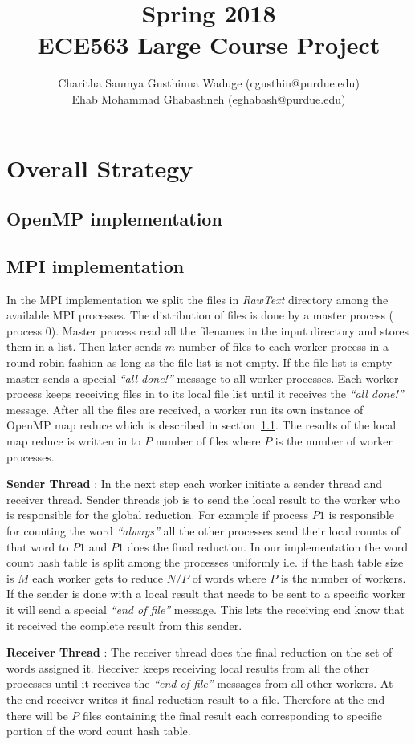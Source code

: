 \documentclass[12pt]{article}
\title{Spring 2018\\  ECE563 Large Course Project}
\author{Charitha Saumya Gusthinna Waduge (cgusthin@purdue.edu) \\ Ehab Mohammad Ghabashneh (eghabash@purdue.edu)}
\begin{document}
\maketitle
\section{Overall Strategy}
\subsection{OpenMP implementation}
\label{omp-impl}
\subsection{MPI implementation}
In the MPI implementation we split the files in {\em RawText } directory among the available MPI processes. The distribution of files is done by a master process ( process $0$).
Master process read all the filenames in the input directory and stores them in a list. Then later sends $m$  number of files to each worker process in a round robin fashion as long as the file
list is not empty. If the file list is empty master sends a special {\em ``all done!''} message to all worker processes. Each worker process keeps receiving files in to its local file list until
it receives the {\em``all done!''} message. After all the files are received, a worker run its own instance of OpenMP map reduce which is described in section~\ref{omp-impl}. The results of the
local map reduce is written in to $P$ number of files where $P$ is the number of worker processes. 

\noindent \textbf{Sender Thread} : In the next step each worker initiate a sender thread and receiver thread. Sender threads job is
to send the local result to the worker who is responsible for the global reduction. For example if process $P1$ is responsible for counting the word {\em ``always''} all the other processes send their
local counts of that word to $P1$ and $P1$ does the final reduction. In our implementation the word count hash table is split among the processes uniformly i.e. if the hash table size is $M$ each worker gets 
to reduce $N/P$ of words where $P$ is the number of workers. If the sender is done with a local result that needs to be sent to a specific worker it will send a special {\em ``end of file''} message. This
lets the receiving end know that it received the complete result from this sender. 

\noindent \textbf{Receiver Thread} : The receiver thread does the final reduction on the set of words assigned it. Receiver keeps receiving local results from all the other processes until it 
receives the {\em ``end of file''} messages from all 
other workers. At the end receiver writes it final reduction result to a file. Therefore at the end there will be $P$ files containing the final result each corresponding to specific portion of the word 
count hash table. 
\end{document}
